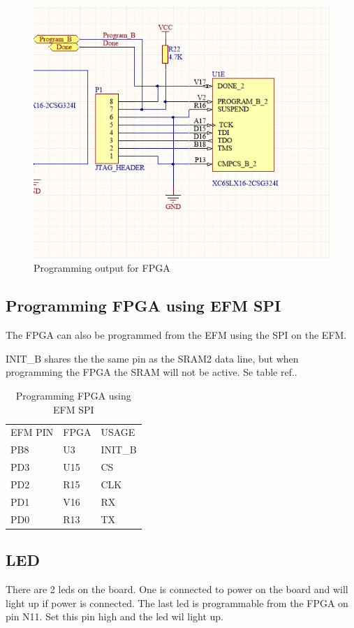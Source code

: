 \begin{figure}
    \includegraphics[width=\linewidth]{img/FPGA_Programmer.png}
    \caption{Programming output for FPGA}
    \label{fig:fpgaprogrammer}
\end{figure}

\subsection{Programming FPGA using EFM SPI}
The FPGA can also be programmed from the EFM using the SPI on the EFM. 

INIT\_B shares the the same pin as the SRAM2 data line, but when programming the FPGA the SRAM will not be active. Se table ref..

\begin{table}[]
    \centering
    \caption{Programming FPGA using EFM SPI}
    \label{spiprogrammer}
    \begin{tabular}{lll}
        EFM PIN & FPGA & USAGE   \\
        PB8     & U3   & INIT\_B \\
        PD3     & U15  & CS      \\
        PD2     & R15  & CLK     \\
        PD1     & V16  & RX      \\
        PD0     & R13  & TX
    \end{tabular}
\end{table}
\subsection{LED}
There are 2 leds on the board. One is connected to power on the board and will light up if power is connected. The last led is programmable from the FPGA on pin N11. Set this pin high and the led wil light up.
